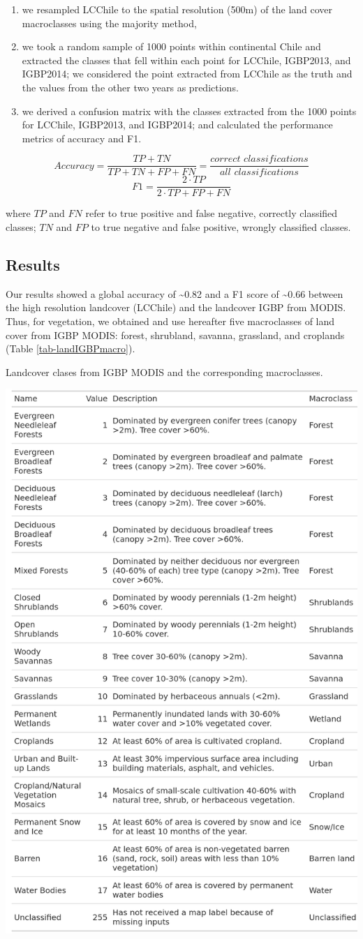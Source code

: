 \documentclass[
  authoryear,
  preprint,
  3p,
  onecolumn]{elsarticle}
\providecommand{\tightlist}{%
  \setlength{\itemsep}{0pt}\setlength{\parskip}{0pt}}\usepackage{longtable,booktabs,array}
\begin{document}
\begin{enumerate}
\def\labelenumi{\roman{enumi})}
\tightlist
\item
  we resampled LCChile to the spatial resolution (500m) of the land
  cover macroclasses using the majority method,
\item
  we took a random sample of 1000 points within continental Chile and
  extracted the classes that fell within each point for LCChile,
  IGBP2013, and IGBP2014; we considered the point extracted from LCChile
  as the truth and the values from the other two years as predictions.
\item
  we derived a confusion matrix with the classes extracted from the 1000
  points for LCChile, IGBP2013, and IGBP2014; and calculated the
  performance metrics of accuracy and F1.
\end{enumerate}

\[Accuracy = \frac{TP+TN}{TP+TN+FP+FN}=\frac{correct\,\, classifications}{all\,\, classifications}\]
\[F1=\frac{2\cdot TP}{2\cdot TP + FP +FN}\]

where \(TP\) and \(FN\) refer to true positive and false negative,
correctly classified classes; \(TN\) and \(FP\) to true negative and
false positive, wrongly classified classes.

\subsection{Results}\label{results-2}

Our results showed a global accuracy of \textasciitilde0.82 and a F1
score of \textasciitilde0.66 between the high resolution landcover
(LCChile) and the landcover IGBP from MODIS. Thus, for vegetation, we
obtained and use hereafter five macroclasses of land cover from IGBP
MODIS: forest, shrubland, savanna, grassland, and croplands (Table
\ref{tab-landIGBPmacro}).

\begin{table}[!ht]
\caption{Landcover clases from IGBP MODIS and the corresponding macroclasses.}
\label{tab-landIGBPmacro}
\centering
\includegraphics[width = .5\textwidth]{figs/tabla_landcover_macroclass.png}
\end{table}
\end{document}
